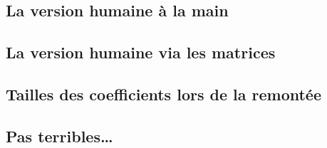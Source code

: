 \subsection{La version \og humaine \fg{} à la main} 






\newpage
\subsection{La version \og humaine \fg{} via les matrices} 







\subsection{Tailles des coefficients lors de la remontée} \label{human-size}







\subsection{Pas terribles\dots{}} 



